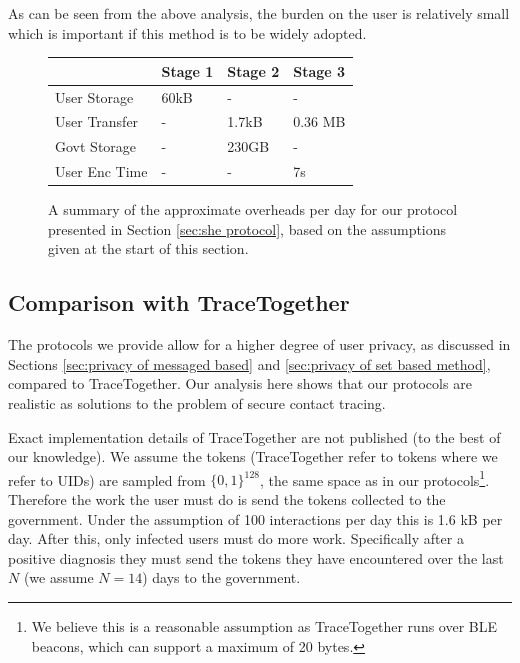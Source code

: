 \documentclass{article}
\begin{document}
As can be seen from the above analysis, the burden on the user is relatively small which is important if this method is to be widely adopted.


\begin{figure}\label{table:eID_comparison}
    \centering
    \begin{tabular}{ |p{2.7cm}||p{1.3cm}|p{1.3cm}|p{1.3cm}| }
     \hline
      & Stage 1 & Stage 2 & Stage 3  \\
     \hline
     User Storage & 60kB & -      & -                 \\
     User Transfer & -       & 1.7kB   & 0.36 MB           \\
     Govt Storage & -       & 230GB   & -        \\
     User Enc Time & -        &  -     &  7s               \\

     \hline
    \end{tabular}
    \caption{A summary of the approximate overheads per day for our protocol presented in Section \ref{sec:she protocol}, based on the assumptions given at the start of this section.}
    \label{fig:overhead}
\end{figure}
\iffalse
\subsection{Comparison with TraceTogether}

The protocols we provide allow for a higher degree of user privacy, as discussed in Sections \ref{sec:privacy of messaged based} and \ref{sec:privacy of set based method}, compared to TraceTogether. Our analysis here shows that our protocols are realistic as solutions to the problem of secure contact tracing. 

Exact implementation details of TraceTogether are not published (to the best of our knowledge). We assume the tokens (TraceTogether refer to tokens where we refer to UIDs) are sampled from $\{0,1\}^{128}$, the same space as in our protocols\footnote{We believe this is a reasonable assumption as TraceTogether runs over BLE beacons, which can support a maximum of 20 bytes.}. Therefore the work the user must do is send the tokens collected to the government. Under the assumption of 100 interactions per day this is 1.6 kB per day. After this, only infected users must do more work. Specifically after a positive diagnosis they must send the tokens they have encountered over the last $N$ (we assume $N = 14$) days to the government. 
\end{document}
